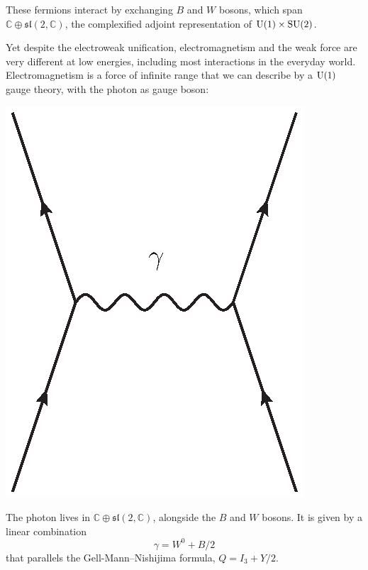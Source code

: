 \documentclass[12pt]{article}
\newcommand{\C}{{\mathbb C}}  %
\newcommand{\U}{{\rm U}}    %
\newcommand{\SU}{{\rm SU}}    %
\renewcommand{\sl}{\mathfrak{sl}} %
\begin{document}
These fermions interact by exchanging $B$ and $W$ bosons, which span $\C
\oplus \sl(2, \C)$, the complexified adjoint representation of $\U(1) \times
\SU(2)$.  

Yet despite the electroweak unification, electromagnetism and the weak force
are very different at low energies, including most interactions in the everyday
world. Electromagnetism is a force of infinite range that we can describe by a
$\U(1)$ gauge theory, with the photon as gauge boson:
\begin{center}
	\includegraphics[scale=0.6]{photon_exchange}
\end{center}
The photon lives in $\C \oplus \sl(2, \C)$, alongside the $B$ and $W$ bosons.
It is given by a linear combination
\[ \gamma = W^0 + B/2 \]
that parallels the Gell-Mann--Nishijima formula, $Q = I_3 + Y/2$.
\end{document}
